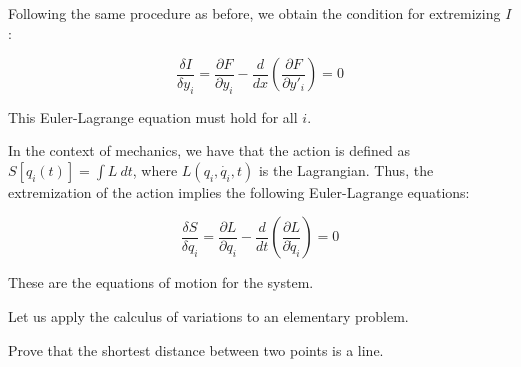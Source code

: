 Following the same procedure as before, we obtain the condition for extremizing $I$:

\begin{equation}
    \frac{\delta I}{\delta y_i} = \frac{\partial F}{\partial y_i} - \frac{d}{dx} \left(\frac{\partial F}{\partial y'_i}\right) = 0
\end{equation}

This Euler-Lagrange equation must hold for all $i$.

In the context of mechanics, we have that the action is defined as 
$S[q_i(t)] = \int L\ dt$, where $L\left(q_i, \dot{q_i}, t\right)$ is the Lagrangian. Thus,
 the extremization of the action implies the following Euler-Lagrange equations:

\begin{equation}
    \frac{\delta S}{\delta q_i} = \frac{\partial L}{\partial q_i} - \frac{d}{dt} \left(\frac{\partial L}{\partial \dot{q}_i}\right) = 0
\end{equation}

These are the equations of motion for the system.

Let us apply the calculus of variations to an elementary problem.

\begin{example}
    Prove that the shortest distance between two points is a line.
\end{example}

